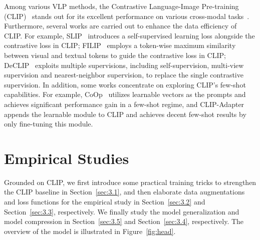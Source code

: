 \documentclass[letterpaper]{article} %
\begin{document}
Among various VLP methods, the Contrastive Language-Image Pre-training (CLIP)~\cite{radford2021learning} stands out for its excellent performance on various cross-modal tasks~\cite{wang2022cris, wang2022clip}. 
Furthermore, several works are carried out to enhance the data efficiency of CLIP. 
For example, SLIP~\cite{mu2022slip} introduces a self-supervised learning loss alongside the contrastive loss in CLIP; FILIP~\cite{yao2021filip} employs a token-wise maximum similarity between visual and textual tokens to guide the contrastive loss in CLIP; DeCLIP~\cite{li2021supervision} exploits multiple supervisions, including self-supervision, multi-view supervision and nearest-neighbor supervision, to replace the single contrastive supervision.
In addition, some works concentrate on exploring CLIP's few-shot capabilities.
For example, CoOp~\cite{zhou2022learning} utilizes learnable vectors as the prompts and achieves significant performance gain in a few-shot regime, and CLIP-Adapter~\cite{gao2021clip} appends the learnable module to CLIP and achieves decent few-shot results by only fine-tuning this module.



\section{Empirical Studies}
\label{sec:3}
Grounded on CLIP, we first introduce some practical training tricks to strengthen the CLIP baseline in Section~\ref{sec:3.1}, and then elaborate data augmentations and loss functions for the empirical study in Section~\ref{sec:3.2} and Section~\ref{sec:3.3}, respectively. 
We finally study the model generalization and model compression in Section~\ref{sec:3.5} and Section~\ref{sec:3.4}, respectively. 
The overview of the model is illustrated in Figure~\ref{fig:head}.
\end{document}
